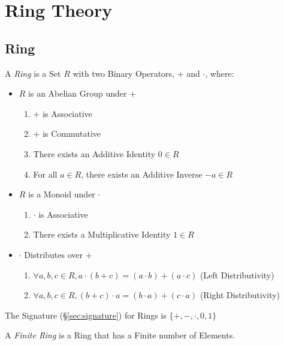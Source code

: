 \section{Ring Theory}\label{sec:ring_theory}

\subsection{Ring}\label{sec:ring}

A \emph{Ring} is a Set $R$ with two Binary Operators, $+$ and
$\cdot$, where:

\begin{itemize}
\item $R$ is an Abelian Group under $+$
    \begin{enumerate}
        \item $+$ is Associative
        \item $+$ is Commutative
        \item There exists an Additive Identity $0 \in R$
        \item For all $a \in R$, there exists an Additive Inverse $-a
          \in R$
    \end{enumerate}
\item $R$ is a Monoid under $\cdot$
    \begin{enumerate}
        \item $\cdot$ is Associative
        \item There exists a Multiplicative Identity $1 \in R$
    \end{enumerate}
\item $\cdot$ Distributes over $+$
    \begin{enumerate}
        \item $\forall a,b,c \in R,
            a \cdot (b + c) = (a \cdot b) + (a \cdot c)$
            (Left Distributivity)
        \item $\forall a,b,c \in R,
            (b + c) \cdot a = (b \cdot a) + (c \cdot a)$
            (Right Distributivity)
    \end{enumerate}
\end{itemize}
The Signature (\S\ref{sec:signature}) for Rings is $\{+, -, \cdot, 0,
1\}$

A \emph{Finite Ring} is a Ring that has a Finite number of Elements.

